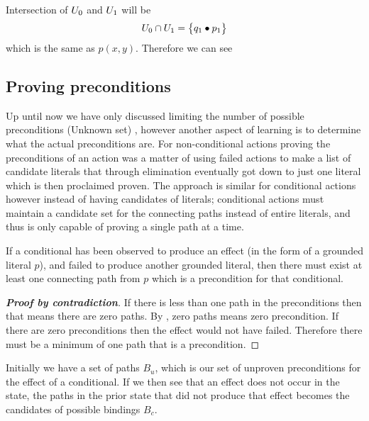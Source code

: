 \documentclass[\master/Master.tex]{subfiles}
\begin{document}
\begin{example}
   Intersection of $U_0$ and $U_1$ will be
	   \begin{align*}
	   	U_0 \cap U_1=
	   	\left\{
	   	\begin{gathered}
	   		q_1 \bullet p_1 
	   	\end{gathered}	
	   	\right\}	
	   \end{align*}
   which is the same as $p(x,y)$. Therefore we can see 
   
   
   
   
\end{example}

\subsection{Proving preconditions}
Up until now we have only discussed limiting the number of possible preconditions (Unknown set) , however another aspect of learning is to determine what the actual preconditions are.
For non-conditional actions proving the preconditions of an action was a matter of using failed actions to make a list of candidate literals that through elimination eventually got down to just one literal which is then proclaimed proven. The approach is similar for conditional actions however instead of having candidates of literals; conditional actions must maintain a candidate set for the connecting paths instead of entire literals, and thus is only capable of proving a single path at a time.

\begin{theorem}\label{thm:minimum-one-binding}
    If a conditional has been observed to produce an effect (in the form of a grounded literal $p$), and failed to produce another grounded literal, then there must exist at least one connecting path from $p$ which is a precondition for that conditional.
\end{theorem}

\begin{proof}[\textbf{Proof by contradiction}] 
    If there is less than one path in the preconditions then that means there are zero paths. By , zero paths means zero precondition. If there are zero preconditions then the effect would not have failed. Therefore there must be a minimum of one path that is a precondition.
\end{proof}

Initially we have a set of paths $B_u$, which is our set of unproven preconditions for the effect of a conditional.
If we then see that an effect does not occur in the state, the paths in the prior state that did not produce that effect becomes the candidates of possible bindings $B_c$.
\end{document}
